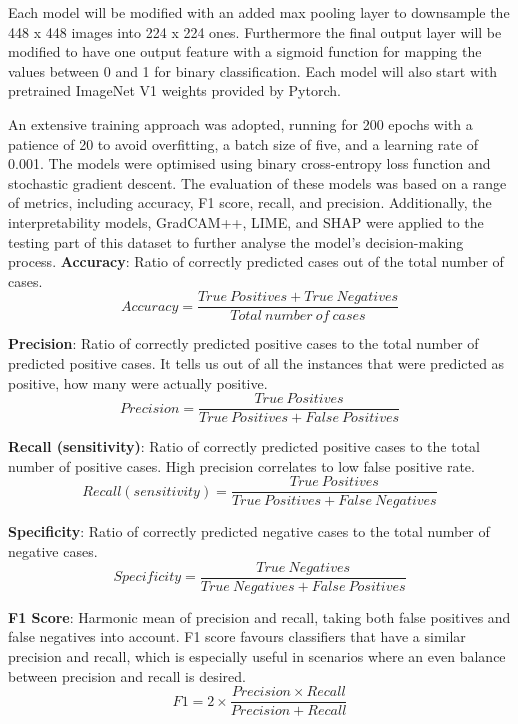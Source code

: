 \documentclass[
	a4paper,
	10pt,
	unnumberedsections,
	twoside,
]{research_article}
\begin{document}
\pagebreak
Each model will be modified with an added max pooling layer to downsample the 448 x 448 images into 224 x 224 ones. Furthermore the final output layer will be modified to have one output feature with a sigmoid function for mapping the values between 0 and 1 for binary classification. Each model will also start with pretrained ImageNet V1 weights provided by Pytorch.

An extensive training approach was adopted, running for 200 epochs with a patience of 20 to avoid overfitting, a batch size of five, and a learning rate of 0.001. The models were optimised using binary cross-entropy loss function and stochastic gradient descent. The evaluation of these models was based on a range of metrics, including accuracy, F1 score, recall, and precision. Additionally, the interpretability models, GradCAM++, LIME, and SHAP were applied to the testing part of this dataset to further analyse the model's decision-making process.
\newline\newline
\textbf{Accuracy}: Ratio of correctly predicted cases out of the total number of cases.
\begin{displaymath}
	Accuracy = \frac{True\ Positives + True\ Negatives}{Total\ number\ of\ cases}
\end{displaymath}

\textbf{Precision}: Ratio of correctly predicted positive cases to the total number of predicted positive cases. It tells us out of all the instances that were predicted as positive, how many were actually positive.
\begin{displaymath}
	Precision = \frac{True\ Positives}{True\ Positives + False\ Positives}
\end{displaymath}

\textbf{Recall (sensitivity)}: Ratio of correctly predicted positive cases to the total number of positive cases. High precision correlates to low false positive rate.
\begin{displaymath}
	Recall (sensitivity) = \frac{True\ Positives}{True\ Positives + False\ Negatives}
\end{displaymath}

\textbf{Specificity}: Ratio of correctly predicted negative cases to the total number of negative cases.
\begin{displaymath}
	Specificity = \frac{True\ Negatives}{True\ Negatives + False\ Positives}
\end{displaymath}

\textbf{F1 Score}: Harmonic mean of precision and recall, taking both false positives and false negatives into account. F1 score favours classifiers that have a similar precision and recall, which is especially useful in scenarios where an even balance between precision and recall is desired.
\begin{displaymath}
	F1 = 2 \times \frac{Precision \times Recall}{Precision + Recall}
\end{displaymath}
\end{document}
